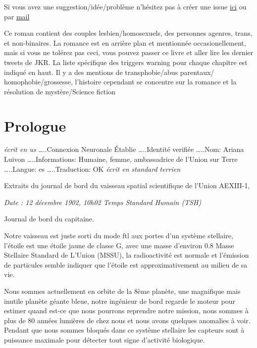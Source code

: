 \documentclass[12pt,colorlinks,a4paper]{book}
\begin{document}
Si vous avez une suggestion/idée/problème n'hésitez pas à créer une issue \href{https://github.com/coco33920/agh-public/issues}{ici}
ou par \href{mailto:contact@nwa2coco.fr}{mail}\par 
\bigskip 

Ce roman contient des couples lesbien/homosexuels, des personnes agenres, trans, et non-binaires. La romance est en arrière plan 
et mentionnée occasionellement, mais si vous ne tolérez pas ceci, vous pouvez passer ce livre et aller lire les dernier tweets de JKR. 
La liste spécifique des triggers warning pour chaque chapitre est indiqué en haut. Il y a des mentions de transphobie/abus parentaux/
homophobie/grossesse, l'histoire cependant se concentre sur la romance et la résolution de mystère/Science fiction\par 
\bigskip

\chapter*{Prologue}

\textit{écrit en \gls{us}}\newline
…..Connexion Neuronale Établie\newline
…..Identité verifiée\newline
…..Nom: Ariana Luivon\newline
…..Informations: Humaine, femme, ambassadrice de l'Union sur Terre\newline
…..Langue: \gls{es}\newline
…..Traduction: OK\newline
\textit{écrit en standard terrien}\par
\bigskip

Extraits du journal de bord du vaisseau spatial scientifique de l'Union
AEXIII-1,

\textit{Date : 12 décembre 1902, 10h02 Temps Standard Humain (TSH)}\par
\bigskip

Journal de bord du capitaine.\par
\bigskip
Notre vaisseau est juste sorti du mode \gls{ftl} aux portes d'un
système stellaire, l'étoile est une étoile jaune de classe G, avec
une masse d'environ 0.8 Masse Stellaire Standard de L'Union (MSSU),
la radioactivité est normale et l'émission de particules semble indiquer
que l'étoile est approximativement au milieu de sa vie.

\bigskip
Nous sommes actuellement en orbite de la 8ème planète, une magnifique
mais inutile planète géante bleue, notre ingénieur de bord regarde
le moteur pour estimer quand est-ce que nous pourrons reprendre notre
mission, nous sommes à plus de 80 années lumières de chez nous et
nous avons quelques anomalies à voir. Pendant que nous sommes bloqués
dans ce système stellaire les capteurs sont à puissance maximale pour
détecter tout signe d'activité biologique.\par 
\bigskip
\end{document}
